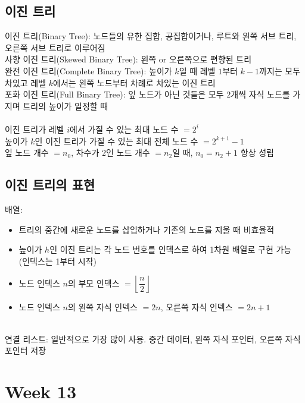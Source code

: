 \subsection{이진 트리}
이진 트리(Binary Tree): 노드들의 유한 집합, 공집합이거나, 루트와 왼쪽 서브 트리, 오른쪽 서브 트리로 이루어짐\\
사향 이진 트리(Skewed Binary Tree): 왼쪽 or 오른쪽으로 편향된 트리\\
완전 이진 트리(Complete Binary Tree): 높이가 $k$일 때 레벨 $1$부터 $k-1$까지는 모두 차있고 레벨 $k$에서는 왼쪽 노드부터 차례로 차있는 이진 트리\\
포화 이진 트리(Full Binary Tree): 잎 노드가 아닌 것들은 모두 $2$개씩 자식 노드를 가지며 트리의 높이가 일정할 때
\\\\
이진 트리가 레벨 $i$에서 가질 수 있는 최대 노드 수 $= 2^i$\\
높이가 $k$인 이진 트리가 가질 수 있는 최대 전체 노드 수 $= 2^{k + 1} - 1$\\
잎 노드 개수 $= n_0$, 차수가 $2$인 노드 개수 $= n_2$일 때, $n_0 = n_2 + 1$ 항상 성립

\subsection{이진 트리의 표현}
배열:
\begin{itemize}
    \item 트리의 중간에 새로운 노드를 삽입하거나 기존의 노드를 지울 때 비효율적
    \item 높이가 $h$인 이진 트리는 각 노드 번호를 인덱스로 하여 1차원 배열로 구현 가능 (인덱스는 1부터 시작)
    \item 노드 인덱스 $n$의 부모 인덱스 $= \left\lfloor \dfrac{n}{2} \right\rfloor$
    \item 노드 인덱스 $n$의 왼쪽 자식 인덱스 $= 2n$, 오른쪽 자식 인덱스 $= 2n + 1$
\end{itemize}\phantom{}\\
연결 리스트: 일반적으로 가장 많이 사용. 중간 데이터, 왼쪽 자식 포인터, 오른쪽 자식 포인터 저장

\newpage
\section{Week 13}
